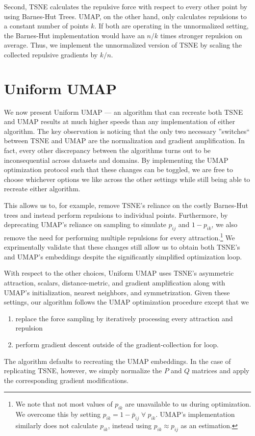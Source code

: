 \documentclass[sigconf, nonacm]{acmart}
\newcommand\ourmethod{Uniform UMAP }
\begin{document}
Second, TSNE calculates the repulsive force with respect to every other point by using Barnes-Hut Trees. UMAP, on the other hand, only calculates repulsions to
a constant number of points $k$. If both are operating in the unnormalized setting, the Barnes-Hut implementation would have an $n/k$ times stronger repulsion
on average. Thus, we implement the unnormalized version of TSNE by scaling the collected repulsive gradients by $k/n$.

\section{\ourmethod} \label{uniform}
We now present \ourmethod  --- an algorithm that can recreate both TSNE and UMAP results at much higher speeds than any implementation of either algorithm.
The key observation is noticing that the only two necessary ''switches`` between TSNE and UMAP are the normalization and gradient amplification. In fact,
every other discrepancy between the algorithms turns out to be inconsequential across datasets and domains.
By implementing the UMAP optimization protocol such that these changes can be toggled,
we are free to choose whichever options we like across the other settings while still being able to recreate either algorithm.

This allows us to, for example, remove TSNE's reliance on the costly Barnes-Hut trees and instead perform repulsions to individual points.
Furthermore, by deprecating UMAP's reliance on sampling to simulate $p_{ij}$ and $1 - p_{ik}$, we also remove the need for performing multiple repulsions for every
attraction.\footnote{We note that not most values of $p_{ik}$ are unavailable to us during optimization. We overcome this by setting $p_{ik} = 1 - \bar{p}_{ij}
\; \forall \; p_{ik}$. UMAP's implementation similarly does not calculate $p_{ik}$, instead using $p_{ik} \approx p_{ij}$ as an estimation.} We exprimentally
validate that these changes still allow us to obtain both TSNE's and UMAP's embeddings despite the significantly simplified optimization loop.

With respect to the other choices, \ourmethod  uses TSNE's asymmetric attraction, scalars, distance-metric, and gradient amplification along with UMAP's
initialization, nearest neighbors, and symmetrization. Given these settings, our algorithm follows the UMAP optimization procedure except that we
\begin{enumerate}
        \item replace the force sampling by iteratively processing every attraction and repulsion
        \item perform gradient descent outside of the gradient-collection for loop.
\end{enumerate}
The algorithm defaults to recreating the UMAP embeddings. In the case of replicating TSNE, however, we simply normalize the $P$ and $Q$ matrices and apply the
corresponding gradient modifications.
\end{document}
